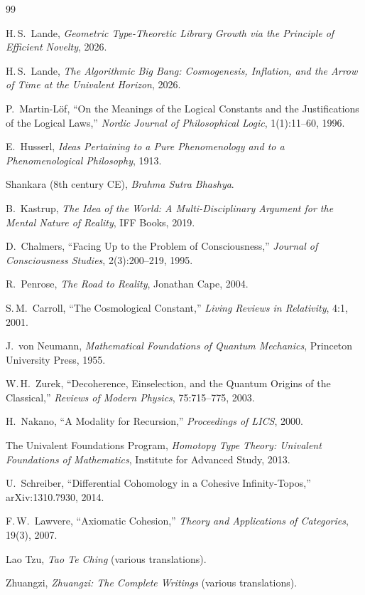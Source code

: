 \documentclass[12pt,a4paper]{article}
\begin{document}
\begin{thebibliography}{99}

 H.\,S.\ Lande, \emph{Geometric Type-Theoretic Library Growth via the Principle of Efficient Novelty}, 2026.

 H.\,S.\ Lande, \emph{The Algorithmic Big Bang: Cosmogenesis, Inflation, and the Arrow of Time at the Univalent Horizon}, 2026.

 P.\ Martin-L\"of, ``On the Meanings of the Logical Constants and the Justifications of the Logical Laws,'' \emph{Nordic Journal of Philosophical Logic}, 1(1):11--60, 1996.

 E.\ Husserl, \emph{Ideas Pertaining to a Pure Phenomenology and to a Phenomenological Philosophy}, 1913.

 Shankara (8th century CE), \emph{Brahma Sutra Bhashya}.

 B.\ Kastrup, \emph{The Idea of the World: A Multi-Disciplinary Argument for the Mental Nature of Reality}, I\!F\!F Books, 2019.

 D.\ Chalmers, ``Facing Up to the Problem of Consciousness,'' \emph{Journal of Consciousness Studies}, 2(3):200--219, 1995.

 R.\ Penrose, \emph{The Road to Reality}, Jonathan Cape, 2004.

 S.\,M.\ Carroll, ``The Cosmological Constant,'' \emph{Living Reviews in Relativity}, 4:1, 2001.

 J.\ von Neumann, \emph{Mathematical Foundations of Quantum Mechanics}, Princeton University Press, 1955.

 W.\,H.\ Zurek, ``Decoherence, Einselection, and the Quantum Origins of the Classical,'' \emph{Reviews of Modern Physics}, 75:715--775, 2003.

 H.\ Nakano, ``A Modality for Recursion,'' \emph{Proceedings of LICS}, 2000.

 The Univalent Foundations Program, \emph{Homotopy Type Theory: Univalent Foundations of Mathematics}, Institute for Advanced Study, 2013.

 U.\ Schreiber, ``Differential Cohomology in a Cohesive Infinity-Topos,'' arXiv:1310.7930, 2014.

 F.\,W.\ Lawvere, ``Axiomatic Cohesion,'' \emph{Theory and Applications of Categories}, 19(3), 2007.

 Lao Tzu, \emph{Tao Te Ching} (various translations).

 Zhuangzi, \emph{Zhuangzi: The Complete Writings} (various translations).

\end{thebibliography}
\end{document}
